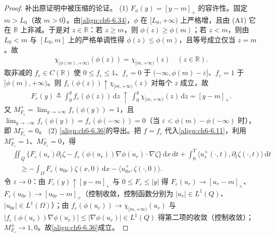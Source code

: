 \documentclass[../../main.tex]{subfiles}%
\begin{document}
\begin{proof}
补出原证明中被压缩的论证。
(1) $F_\phi(y)=[y-m]_+$ 的容许性。固定 $m>L_0$（故 $m>0$）。由\eqref{align:ch6-6.34}，$\phi$ 在 $[L_0,+\infty)$ 上严格增，且由 (A1) 它在 $\mathbb{R}$ 上非减。于是对 $z\in\mathbb{R}$：若 $z\geqslant m$，则 $\phi(z)\geqslant\phi(m)$；若 $z<m$，则由 $L_0<m$ 与 $[L_0,m]$ 上的严格单调性得 $\phi(z)\leqslant\phi(m)$，且等号成立仅当 $z=m$。故
\begin{align*}
\chi_{[\phi(m),+\infty)}(\phi(z))=\chi_{[m,+\infty)}(z)\quad(z\in\mathbb{R}).
\end{align*}
取非减的 $f_\varepsilon\in C(\mathbb{R})$ 使 $0\leqslant f_\varepsilon\leqslant1$、$f_\varepsilon=0$ 于 $(-\infty,\phi(m)-\varepsilon]$、$f_\varepsilon=1$ 于 $[\phi(m),+\infty)$。则 $f_\varepsilon(\phi(z))\uparrow\chi_{[m,+\infty)}(z)$ 对每个 $z$ 成立，故
\begin{align*}
F_\varepsilon(y)\triangleq\int_0^y f_\varepsilon(\phi(z))\,\mathrm{d}z\ \uparrow\ \int_0^y\chi_{[m,+\infty)}(z)\,\mathrm{d}z=[y-m]_+ .
\end{align*}
又 $M^+_{F_\varepsilon}=\lim_{y\to+\infty}f_\varepsilon(\phi(y))=1$，且 $\lim_{y\to-\infty}f_\varepsilon(\phi(y))=f_\varepsilon(\phi(-\infty))=0$（当 $\varepsilon<\phi(m)-\phi(-\infty)$ 时），即 $M^-_{F_\varepsilon}=0$。
(2) \eqref{align:ch6-6.36}的导出。把 $f=f_\varepsilon$ 代入\eqref{align:ch6-6.11}，利用 $M^+_{F_\varepsilon}=1$、$M^-_{F_\varepsilon}=0$，得
\begin{align*}
&\iint_Q\{F_\varepsilon(u_r)\partial_t\zeta-f_\varepsilon(\phi(u_r))\nabla\phi(u_r)\cdot\nabla\zeta\}\,\mathrm{d}x\,\mathrm{d}t
+\int_0^T\langle u^+_s(\cdot,t),\partial_t\zeta(\cdot,t)\rangle\,\mathrm{d}t\\
&\quad\geqslant-\int_\Omega F_\varepsilon(u_{0r})\zeta(x,0)\,\mathrm{d}x-\langle u^+_{0s},\zeta(\cdot,0)\rangle .
\end{align*}
令 $\varepsilon\to0$：由 $F_\varepsilon(y)\uparrow[y-m]_+$ 与 $0\leqslant F_\varepsilon\leqslant|y|$ 得 $F_\varepsilon(u_r)\to[u_r-m]_+$、$F_\varepsilon(u_{0r})\to[u_{0r}-m]_+$（控制收敛，控制函数分别为 $|u_r|\in L^1(Q)$、$|u_{0r}|\in L^1(\Omega)$）；由 $f_\varepsilon(\phi(u_r))\to\chi_{[m,+\infty)}(u_r)$ 与 $|f_\varepsilon(\phi(u_r))\nabla\phi(u_r)|\leqslant|\nabla\phi(u_r)|\in L^1(Q)$ 得第二项的收敛（控制收敛）；$M^\pm_{F_\varepsilon}\to1,0$。故\eqref{align:ch6-6.36}成立。

\end{proof}
\end{document}
